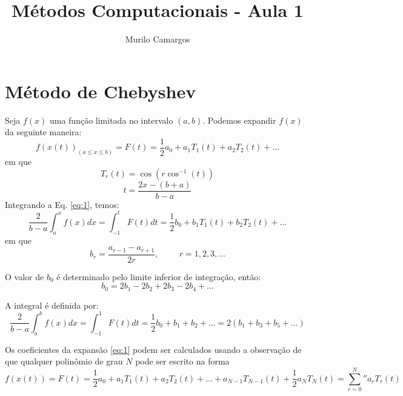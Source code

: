 \documentclass[10pt,a4paper]{article}
\author{Murilo Camargos}
\title{Métodos Computacionais - Aula 1}
\begin{document}


	\section{Método de Chebyshev}
	Seja $f(x)$ uma função limitada no intervalo $(a,b)$. Podemos expandir $f(x)$ da seguinte maneira:
	\begin{equation}
		f(x(t))_{(a\leq x\leq b)} = F(t) = \frac{1}{2}a_0 + a_1T_1(t) + a_2T_2(t) + \dots
		\label{eq:1}
	\end{equation}
	em que
	\[T_r(t) = \cos{\left(r \cos^{-1}{(t)}\right)}\]
	\[t = \frac{2x - (b+a)}{b-a}\]
	Integrando a Eq. \ref{eq:1}, temos:
	\begin{equation}
		\frac{2}{b-a}\int_a^xf(x)dx = \int_{-1}^tF(t)dt = \frac{1}{2}b_0+b_1T_1(t)+b_2T_2(t)+\dots
		\label{eq:2}
	\end{equation}
	em que
	\[b_r = \frac{a_{r-1}-a_{r+1}}{2r}, \hspace{1cm} r=1,2,3,\dots\]
	
	O valor de $b_0$ é determinado pelo limite inferior de integração, então:
	\[b_0 = 2b_1 - 2b_2 + 2b_3 - 2b_4 + \dots\]
	
	A integral é definida por:
	\begin{equation}
		\frac{2}{b-a}\int_a^bf(x)dx = \int_{-1}^1F(t)dt = \frac{1}{2}b_0+b_1+b_2+\dots = 2\left(b_1+b_3+b_5+\dots\right)
		\label{eq:3}
	\end{equation}
	
	Os coeficientes da expansão \ref{eq:1} podem ser calculados usando a observação de que qualquer polinômio de grau $N$ pode ser escrito na forma
	\begin{equation}
		f(x(t)) = F(t) = \frac{1}{2}a_0+a_1T_1(t)+a_2T_2(t)+\dots+a_{N-1}T_{N-1}(t)+\frac{1}{2}a_NT_N(t) = {\sum_{r=0}^N}'' a_rT_r(t)
		\label{eq:4}
	\end{equation}
	
\end{document}
